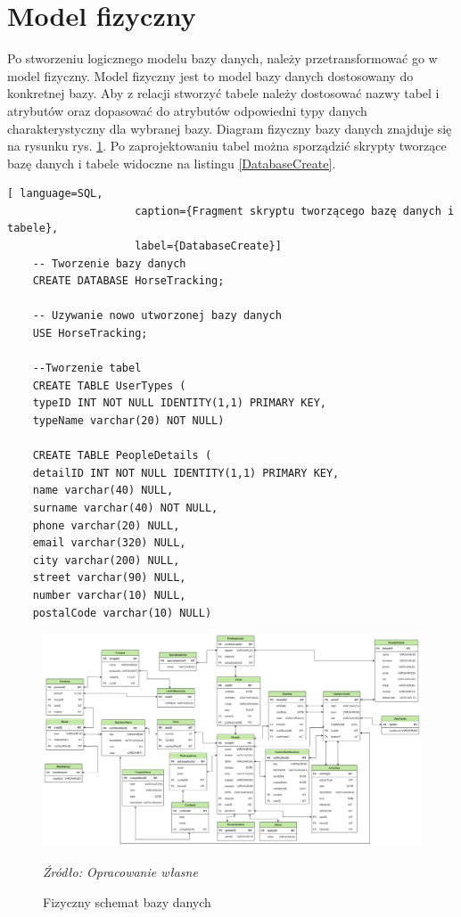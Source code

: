 \documentclass[12pt,oneside]{report}
\begin{document}
\section{Model fizyczny}
Po stworzeniu logicznego modelu bazy danych, należy przetransformować go w model fizyczny. Model fizyczny jest to model bazy danych dostosowany do konkretnej bazy. Aby z relacji stworzyć tabele należy dostosować nazwy tabel i atrybutów oraz dopasować do atrybutów odpowiedni typy danych charakterystyczny dla wybranej bazy. Diagram fizyczny bazy danych znajduje się na rysunku rys. \ref{DiagramFizyczny}. Po zaprojektowaniu tabel można sporządzić skrypty tworzące bazę danych i tabele widoczne na listingu \ref{DatabaseCreate}.
\begin{lstlisting}[ language=SQL, 
					caption={Fragment skryptu tworzącego bazę danych i tabele},
					label={DatabaseCreate}]				
	-- Tworzenie bazy danych
	CREATE DATABASE HorseTracking;
	
	-- Uzywanie nowo utworzonej bazy danych
	USE HorseTracking;
	
	--Tworzenie tabel
	CREATE TABLE UserTypes (
	typeID INT NOT NULL IDENTITY(1,1) PRIMARY KEY,
	typeName varchar(20) NOT NULL)
	
	CREATE TABLE PeopleDetails (
	detailID INT NOT NULL IDENTITY(1,1) PRIMARY KEY,
	name varchar(40) NULL,
	surname varchar(40) NOT NULL,
	phone varchar(20) NULL,
	email varchar(320) NULL,
	city varchar(200) NULL,
	street varchar(90) NULL,
	number varchar(10) NULL,
	postalCode varchar(10) NULL)
\end{lstlisting}


\begin{figure}[H]
	\centering
	\includegraphics[scale=0.32, angle=-90]{DiagramFizyczny}
	\caption{Fizyczny schemat bazy danych}
	\textit{Źródło: Opracowanie własne}
	\label{DiagramFizyczny}
\end{figure}
\end{document}
